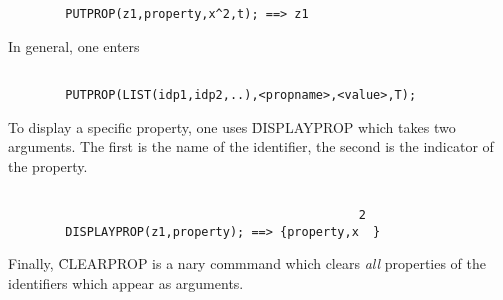 \begin{itemize}
\begin{verbatim}
        PUTPROP(z1,property,x^2,t); ==> z1

\end{verbatim}
In general, one enters
\begin{verbatim}

        PUTPROP(LIST(idp1,idp2,..),<propname>,<value>,T);

\end{verbatim}
To display a specific property, one uses
\f{DISPLAYPROP} which takes two arguments. The first is the name of the
identifier, the second is the indicator of the property.
\begin{verbatim}

                                                 2
        DISPLAYPROP(z1,property); ==> {property,x  }

\end{verbatim}
Finally, \f{CLEARPROP} is a nary commmand which clears {\em all}
properties of the identifiers which appear as arguments.
\end{itemize}
